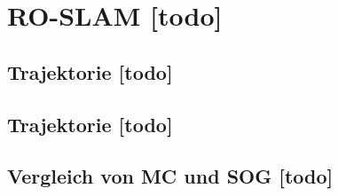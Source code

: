 \begin{comment}
		
- Versuchsbeschreibung:
	- Warum wurden die uwbm da platziert wo sie jetzt stehen?
	
- Bauhaus
	- Rohr mit einer Höhe von x und einem Durchmesser 4-5 cm mit Kappe
	- Schrauben
	- Malerband?

\end{comment}
\section{RO-SLAM [todo]}


\begin{comment}
--------------------------------------------------------------------------------
\end{comment}
\subsection{Trajektorie [todo]}


\begin{comment}
--------------------------------------------------------------------------------
\end{comment}
\subsection{Trajektorie [todo]}


\begin{comment}
--------------------------------------------------------------------------------
\end{comment}
\subsection{Vergleich von MC und SOG [todo]}

